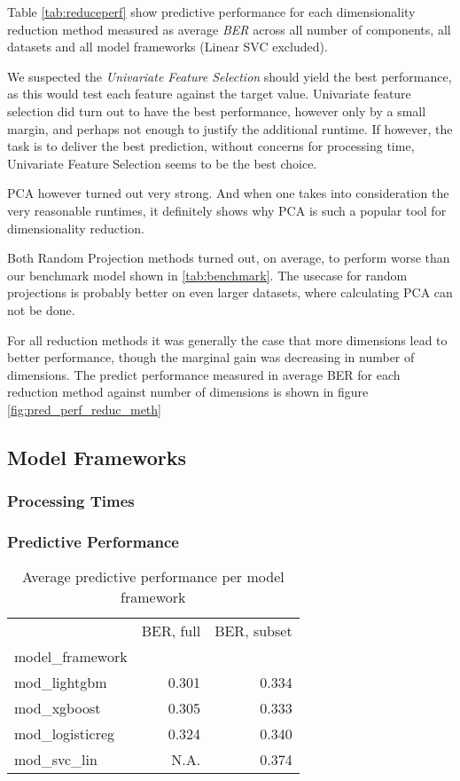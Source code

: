 \documentclass[12pt]{article}
\begin{document}
Table \ref{tab:reduceperf} show predictive performance for each dimensionality reduction method measured as average \emph{BER} across all number of components, all datasets and all model frameworks (Linear SVC excluded).

We suspected the \emph{Univariate Feature Selection} should yield the best performance, as this would test each feature against the target value. Univariate feature selection did turn out to have the best performance, however only by a small margin, and perhaps not enough to justify the additional runtime. If however, the task is to deliver the best prediction, without concerns for processing time, Univariate Feature Selection seems to be the best choice.

PCA however turned out very strong. And when one takes into consideration the very reasonable runtimes, it definitely shows why PCA is such a popular tool for dimensionality reduction.

Both Random Projection methods turned out, on average, to perform worse than our benchmark model shown in \ref{tab:benchmark}. The usecase for random projections is probably better on even larger datasets, where calculating PCA can not be done.

For all reduction methods it was generally the case that more dimensions lead to better performance, though the marginal gain was decreasing in number of dimensions. The predict performance measured in average BER for each reduction method against number of dimensions is shown in figure \ref{fig:pred_perf_reduc_meth}


\subsection{Model Frameworks}

\subsubsection{Processing Times}


\subsubsection{Predictive Performance}

\begin{table}[h]
\centering
\begin{tabular}{lrr}
\toprule
{} 				& BER, full	& BER, subset\\
model\_framework & 			& \\
\midrule
mod\_lightgbm	& 0.301	&  0.334 \\
mod\_xgboost		& 0.305	&  0.333 \\
mod\_logisticreg	& 0.324	&  0.340 \\
mod\_svc\_lin		& N.A.	&  0.374 \\
\bottomrule
\end{tabular}
\caption{\label{tab:modperf} Average predictive performance per model framework}
\end{table}
\end{document}
